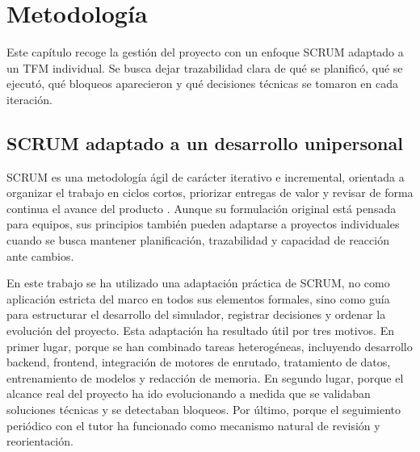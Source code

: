 \chapter{Metodología}
\label{ch:metodologia}

Este capítulo recoge la gestión del proyecto con un enfoque SCRUM adaptado a un TFM individual. Se busca dejar trazabilidad clara de qué se planificó, qué se ejecutó, qué bloqueos aparecieron y qué decisiones técnicas se tomaron en cada iteración.


\section{SCRUM adaptado a un desarrollo unipersonal}

SCRUM es una metodología ágil de carácter iterativo e incremental, orientada a organizar el trabajo en ciclos cortos, priorizar entregas de valor y revisar de forma continua el avance del producto \cite{ScrumGuide2020}. Aunque su formulación original está pensada para equipos, sus principios también pueden adaptarse a proyectos individuales cuando se busca mantener planificación, trazabilidad y capacidad de reacción ante cambios.

En este trabajo se ha utilizado una adaptación práctica de SCRUM, no como aplicación estricta del marco en todos sus elementos formales, sino como guía para estructurar el desarrollo del simulador, registrar decisiones y ordenar la evolución del proyecto. Esta adaptación ha resultado útil por tres motivos. En primer lugar, porque se han combinado tareas heterogéneas, incluyendo desarrollo backend, frontend, integración de motores de enrutado, tratamiento de datos, entrenamiento de modelos y redacción de memoria. En segundo lugar, porque el alcance real del proyecto ha ido evolucionando a medida que se validaban soluciones técnicas y se detectaban bloqueos. Por último, porque el seguimiento periódico con el tutor ha funcionado como mecanismo natural de revisión y reorientación.

